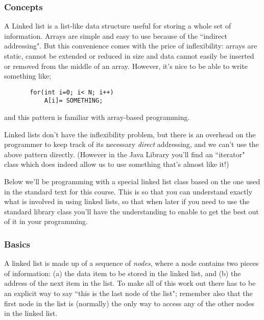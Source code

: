 \documentclass[twoside=false,DIV=14]{scrartcl}
\begin{document}
\subsubsection*{Concepts}
A Linked list is a list-like data structure useful for storing a whole set of information.  Arrays are simple and easy to use because of the ``indirect addressing". But this convenience comes with the price of inflexibility: arrays are static, cannot be extended or reduced in size and data cannot easily be inserted or removed from the middle of an array. However, it's nice to be able to write something like;
\begin{verbatim}
       for(int i=0; i< N; i++) 
           A[i]= SOMETHING;
\end{verbatim}
and this pattern is familiar with array-based programming.


Linked lists don't have the inflexibility problem, but there is an overhead on the programmer to keep track of its necessary \emph{direct} addressing, and we can't use the above pattern directly. (However in the Java Library you'll find an ``iterator" class which does indeed allow us to use something that's almost like it!)

Below we'll be programming with a special linked list class based on the one used in the standard text for this course. This is so that you can understand exactly what is involved in using linked lists, so that when later if you need to use the standard library class you'll have the understanding to  enable to get the best out of it in your programming.

\subsubsection*{Basics}

A linked list is made up of a sequence of \emph{nodes}, where a node contains two pieces of information: (a) the data item to be stored in the linked list, and (b) the address of the next item in the list. To make all of this work out there has to be an explicit way to say ``this is the last node of the list"; remember also that the first node in the list is (normally) the only way to access any of the other nodes in the linked list.
\end{document}
